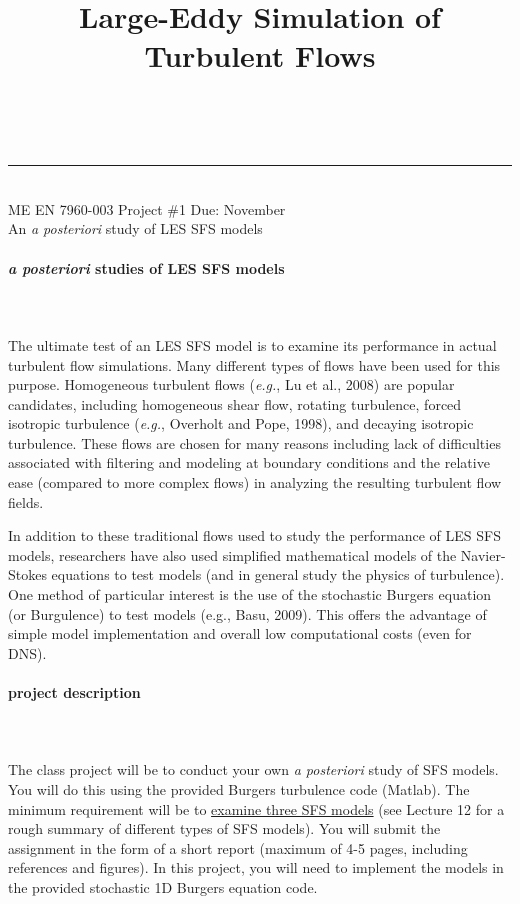 \documentclass[11pt]{article}
\makeatletter
\newcommand{\linia}{\rule{\linewidth}{0.5pt}}
\renewcommand{\maketitle}{
\begin{center}
\vspace{2ex}
{\huge \textsc{\@title}}
\vspace{1ex}
\\
\linia\\
ME EN 7960-003 \hfill Project \#1 \hfill Due: November \nth{22}\\
An \textit{a posteriori} study of LES SFS models
\vspace{4ex}
\end{center}
}
\makeatother
\begin{document}

\title{Large-Eddy Simulation of Turbulent Flows}

\maketitle
\vspace{-20pt}
\paragraph{\large \textit{a posteriori} studies of LES SFS models}~\\\\
The ultimate test of an LES SFS model is to examine its performance in actual turbulent flow simulations.  Many different types of flows have been used for this purpose. Homogeneous turbulent flows (\textit{e.g.}, Lu et al., 2008) are popular candidates, including homogeneous shear flow, rotating turbulence, forced isotropic turbulence (\textit{e.g.}, Overholt and Pope, 1998), and decaying isotropic turbulence.  These flows are chosen for many reasons including lack of difficulties associated with filtering and modeling at boundary conditions and the relative ease (compared to more complex flows) in analyzing the resulting turbulent flow fields.  

In addition to these traditional flows used to study the performance of LES SFS models, researchers have also used simplified mathematical models of the Navier-Stokes equations to test models (and in general study the physics of turbulence). One method of particular interest is the use of the stochastic Burgers equation (or Burgulence) to test models (e.g., Basu, 2009).  This offers the advantage of simple model implementation and overall low computational costs (even for DNS).

\paragraph{\large project description}~\\\\
The class project will be to conduct your own {\it a posteriori} study of SFS models.  You will do this using the provided Burgers turbulence code (Matlab). The minimum requirement will be to \underline{examine three SFS models} (see Lecture 12 for a rough summary of different types of SFS models). You will submit the assignment in the form of a short report (maximum of 4-5 pages, including references and figures). In this project, you will need to implement the models in the provided stochastic 1D Burgers equation code. 
\end{document}
